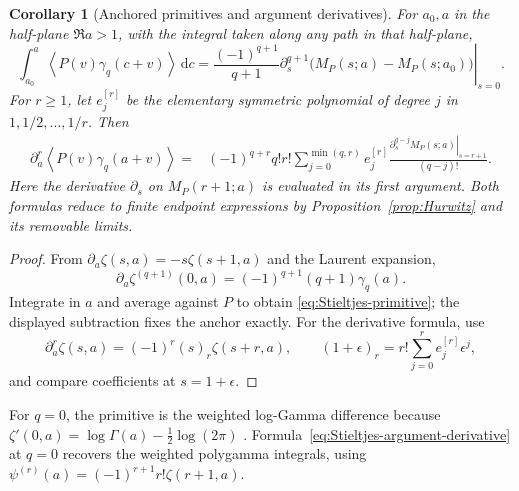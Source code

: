 \documentclass[11pt]{article}
\numberwithin{equation}{section}
\newtheorem{corollary}[theorem]{Corollary}
\theoremstyle{definition}\newtheorem{definition}[theorem]{Definition}
\theoremstyle{remark}\newtheorem{remark}[theorem]{Remark}
\newcommand{\avg}[1]{\left\langle #1\right\rangle}
\newcommand{\dd}{\,\mathrm d}
\begin{document}
\begin{corollary}[Anchored primitives and argument derivatives]
\label{cor:Stieltjes-calculus}
For $a_0,a$ in the half-plane $\Re a>1$, with the integral taken along
any path in that half-plane,
\begin{equation}\label{eq:Stieltjes-primitive}
 \int_{a_0}^a\avg{P(v)\gamma_q(c+v)}\dd c
 =\left.\frac{(-1)^{q+1}}{q+1}\partial_s^{q+1}
       \bigl(M_P(s;a)-M_P(s;a_0)\bigr)\right|_{s=0}.
\end{equation}
For $r\ge1$, let $e_j^{[r]}$ be the elementary symmetric polynomial of
degree $j$ in $1,1/2,\ldots,1/r$. Then
\begin{equation}\label{eq:Stieltjes-argument-derivative}
\begin{split}
 \partial_a^r\avg{P(v)\gamma_q(a+v)}
 ={}&(-1)^{q+r}q!r!
 \sum_{j=0}^{\min(q,r)}e_j^{[r]}
 \frac{\left.\partial_s^{q-j}M_P(s;a)\right|_{s=r+1}}{(q-j)!}.
\end{split}
\end{equation}
Here the derivative $\partial_s$ on $M_P(r+1;a)$ is evaluated in its
first argument. Both formulas reduce to finite endpoint expressions by
Proposition~\ref{prop:Hurwitz} and its removable limits.
\end{corollary}
\begin{proof}
From $\partial_a\zeta(s,a)=-s\zeta(s+1,a)$ and the Laurent expansion,
\[
 \partial_a\zeta^{(q+1)}(0,a)
 =(-1)^{q+1}(q+1)\gamma_q(a).
\]
Integrate in $a$ and average against $P$ to obtain
\eqref{eq:Stieltjes-primitive}; the displayed subtraction fixes the
anchor exactly. For the derivative formula, use
\[
 \partial_a^r\zeta(s,a)=(-1)^r(s)_r\zeta(s+r,a),\qquad
 (1+\epsilon)_r=r!\sum_{j=0}^re_j^{[r]}\epsilon^j,
\]
and compare coefficients at $s=1+\epsilon$.
\end{proof}

For $q=0$, the primitive is the weighted log-Gamma difference because
$\zeta'(0,a)=\log\Gamma(a)-\tfrac12\log(2\pi)$
\cite{DLMF25}. Formula~\eqref{eq:Stieltjes-argument-derivative} at
$q=0$ recovers the weighted polygamma integrals, using
$\psi^{(r)}(a)=(-1)^{r+1}r!\zeta(r+1,a)$.
\end{document}
